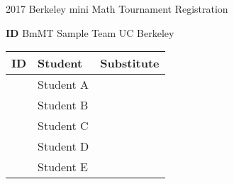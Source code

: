 \documentclass[12pt]{amsart}
\begin{document}
\renewcommand\arraystretch{3.5}
\large
\newcommand{\TeamID}{ID}
\newcommand{\TeamName}{BmMT Sample Team}
\newcommand{\SchoolName}{UC Berkeley}
\newcommand{\IDA}{\qquad1}
\newcommand{\IDB}{\qquad2}
\newcommand{\IDC}{\qquad3}
\newcommand{\IDD}{\qquad4}
\newcommand{\IDE}{\qquad5}
\newcommand{\StudentA}{Student A}
\newcommand{\StudentB}{Student B}
\newcommand{\StudentC}{Student C}
\newcommand{\StudentD}{Student D}
\newcommand{\StudentE}{Student E}
\begin{center}
{\sc \Large 2017 Berkeley mini Math Tournament Registration}

\bigskip
\bigskip

{\bf \Large  \TeamID} \hfill {\large \TeamName} \hfill {\large \SchoolName}

\bigskip
\bigskip

\begin{tabular}{| p{} | p{} | p{} |}
\hline
\bf ID         & \bf Student             & \bf Substitute             \\ \hline
\IDA           & \StudentA               &                            \\ \hline
\IDB           & \StudentB               &                            \\ \hline
\IDC           & \StudentC               &                            \\ \hline
\IDD           & \StudentD               &                            \\ \hline
\IDE           & \StudentE               &                            \\ \hline
\end{tabular} 
\end{center}
\bigskip
\bigskip
\newpage
\end{document}
